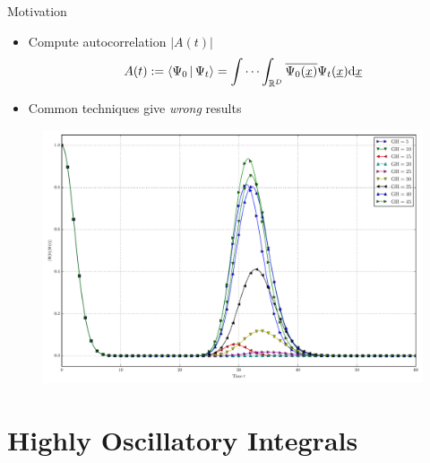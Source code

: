 \documentclass{beamer}
\newcommand{\cemph}[1]{\emph{\color{orange} #1}}
\begin{document}
\begin{frame}{Motivation}
  \begin{itemize}
    \item Compute autocorrelation $|A(t)|$
    \begin{equation*}
      A(t) := \Braket{\Psi_0 | \Psi_t}
           = \idotsint_{\mathbb{R}^D} \overline{\Psi_0(\underline{x})} \Psi_t(\underline{x}) \mathrm{d}\underline{x}
    \end{equation*}
    \item Common techniques give \cemph{wrong} results
  \end{itemize}
  \begin{figure}
    \centering
    \includegraphics[width=0.6\linewidth]{./fig/ac_mercurial_morse.pdf}
  \end{figure}
\end{frame}


\section{Highly Oscillatory Integrals}
\end{document}
